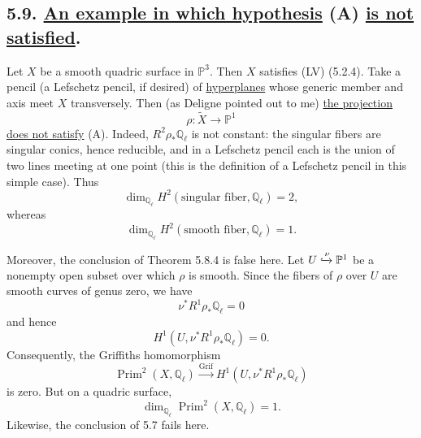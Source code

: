\subsection*{5.9. \underline{An example in which hypothesis} (A)
\underline{is not satisfied}.}

Let $X$ be a smooth quadric surface in $\mathbb P^3$.  Then $X$ satisfies
(LV) (5.2.4).  Take a pencil (a Lefschetz pencil, if desired) of
\underline{hyperplanes} whose generic member and axis meet $X$
transversely.  Then (as Deligne pointed out to me) \underline{the projection}
\[
\rho:\widetilde X\longrightarrow\mathbb P^1
\]
\underline{does not satisfy} (A).  Indeed,
$R^2\rho_*\mathbb Q_\ell$ is not constant: the singular fibers are singular
conics, hence reducible, and in a Lefschetz pencil each is the union of two
lines meeting at one point (this is the definition of a Lefschetz pencil in
this simple case).  Thus
\[
\dim_{\mathbb Q_\ell}H^2(\text{singular fiber},\mathbb Q_\ell)=2,
\]
whereas
\[
\dim_{\mathbb Q_\ell}H^2(\text{smooth fiber},\mathbb Q_\ell)=1.
\]

Moreover, the conclusion of Theorem 5.8.4 is false here.  Let
$U\xhookrightarrow{\nu}\mathbb P^1$ be a nonempty open subset over which
$\rho$ is smooth.  Since the fibers of $\rho$ over $U$ are smooth curves of
genus zero, we have
\[
\nu^*R^1\rho_*\mathbb Q_\ell=0
\]
and hence
\[
H^1(U,\nu^*R^1\rho_*\mathbb Q_\ell)=0.
\]
Consequently, the Griffiths homomorphism
\[
\operatorname{Prim}^2(X,\mathbb Q_\ell)
\xrightarrow{\operatorname{Grif}}
H^1(U,\nu^*R^1\rho_*\mathbb Q_\ell)
\]
is zero.  But on a quadric surface,
\[
\dim_{\mathbb Q_\ell}\operatorname{Prim}^2(X,\mathbb Q_\ell)=1.
\]
Likewise, the conclusion of 5.7 fails here.
